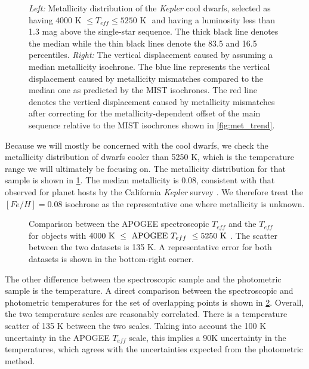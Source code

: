 \documentclass[manuscript]{aastex6}
\newcommand{\Kepler}{\mbox{\textit{Kepler}}}
\newcommand{\Teff}{\ensuremath{T_{eff}}}
\begin{document}
\begin{figure}[htb]
    \centering
    \caption{\emph{Left:} Metallicity distribution of the \Kepler{} cool 
        dwarfs, selected as having \(4000 \textrm{ K } \le \Teff \le 5250 
        \textrm{ K }\) and having a luminosity less than 1.3 mag above the 
        single-star sequence. The thick black line denotes the median while the
    thin black lines denote the 83.5 and 16.5 percentiles. \emph{Right:} The
vertical displacement caused by assuming a median metallicity isochrone. The
blue line represents the vertical displacement caused by metallicity mismatches
compared to the median one as predicted by the MIST isochrones. The red line
denotes the vertical displacement caused by metallicity mismatches after
correcting for the metallicity-dependent offset of the main sequence relative
to the MIST isochrones shown in \cref{fig:met_trend}.}\label{fig:metallicity}
\end{figure}

Because we will mostly be concerned with the cool dwarfs, we check the
metallicity distribution of dwarfs cooler than 5250 K, which is the temperature
range we will ultimately be focusing on. The metallicity distribution for that
sample is shown in \cref{fig:metallicity}. The median metallicity is 
0.08, consistent with that observed for planet hosts by 
the California \Kepler{} survey \citep{Petigura17}.  We therefore treat the \([Fe/H] =
0.08\) isochrone as the representative one where metallicity is unknown.

\begin{figure}[htb]
    \centering
    \caption{Comparison between the APOGEE spectroscopic \Teff{} and the
        \citet{Pinsonneault12} \Teff{} for objects with \(4000 \textrm{ K } \le
    \textrm{ APOGEE \Teff{} } \le 5250 \textrm{ K }\). The scatter between the
two datasets is 135 K. A representative error for both datasets is shown in the
bottom-right corner.}\label{fig:teffdiff}
\end{figure}

The other difference between the spectroscopic sample and the photometric
sample is the temperature. A direct comparison between the spectroscopic 
and photometric temperatures for the set of overlapping points is shown in 
\cref{fig:teffdiff}. Overall, the two temperature scales are reasonably
correlated. There is a temperature scatter of 135 K between the two scales.
Taking into account the 100 K uncertainty in the APOGEE \Teff{} scale, this
implies a 90K uncertainty in the \citep{Pinsonneault12} temperatures, which
agrees with the uncertainties expected from the photometric method. 
\end{document}

